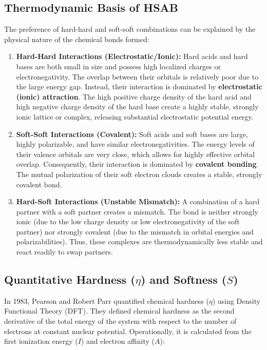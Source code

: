 \documentclass[12pt,a4paper]{article}
\begin{document}
\subsection{Thermodynamic Basis of HSAB}
The preference of hard-hard and soft-soft combinations can be explained by the physical nature of the chemical bonds formed:

\begin{enumerate}
  \item \textbf{Hard-Hard Interactions (Electrostatic/Ionic):}
    Hard acids and hard bases are both small in size and possess high localized charges or electronegativity. The overlap between their orbitals is relatively poor due to the large energy gap. Instead, their interaction is dominated by \textbf{electrostatic (ionic) attraction}. The high positive charge density of the hard acid and high negative charge density of the hard base create a highly stable, strongly ionic lattice or complex, releasing substantial electrostatic potential energy.
  \item \textbf{Soft-Soft Interactions (Covalent):}
    Soft acids and soft bases are large, highly polarizable, and have similar electronegativities. The energy levels of their valence orbitals are very close, which allows for highly effective orbital overlap. Consequently, their interaction is dominated by \textbf{covalent bonding}. The mutual polarization of their soft electron clouds creates a stable, strongly covalent bond.
  \item \textbf{Hard-Soft Interactions (Unstable Mismatch):}
    A combination of a hard partner with a soft partner creates a mismatch. The bond is neither strongly ionic (due to the low charge density or low electronegativity of the soft partner) nor strongly covalent (due to the mismatch in orbital energies and polarizabilities). Thus, these complexes are thermodynamically less stable and react readily to swap partners.
\end{enumerate}

\subsection{Quantitative Hardness \texorpdfstring{($\eta$)}{(eta)} and Softness \texorpdfstring{($S$)}{(S)}}
In 1983, Pearson and Robert Parr quantified chemical hardness ($\eta$) using Density Functional Theory (DFT). They defined chemical hardness as the second derivative of the total energy of the system with respect to the number of electrons at constant nuclear potential. Operationally, it is calculated from the first ionization energy ($I$) and electron affinity ($A$):
\end{document}
